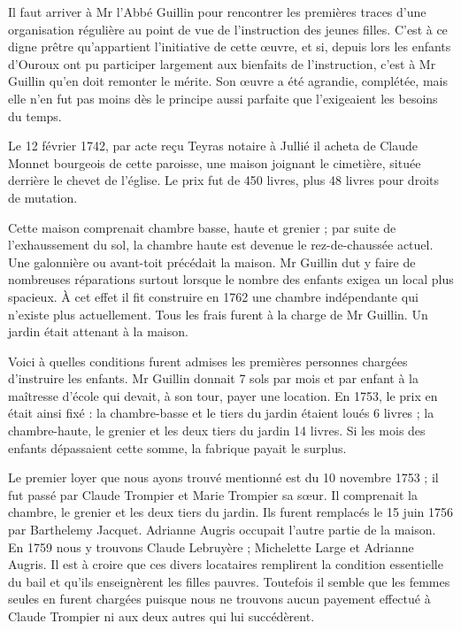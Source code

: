 Il faut arriver à Mr l'Abbé Guillin pour rencontrer les premières traces d'une organisation régulière au point de vue de l'instruction des jeunes filles. C'est à ce digne prêtre qu'appartient l'initiative de cette œuvre, et si, depuis lors les enfants d'Ouroux ont pu participer largement aux bienfaits de l'instruction, c'est
à Mr Guillin qu'en doit remonter le mérite. Son œuvre a été agrandie, complétée, mais elle n'en fut pas moins dès le principe aussi parfaite que l'exigeaient les besoins du temps.

Le 12 février 1742, par acte reçu Teyras notaire à Jullié il acheta de Claude Monnet bourgeois de cette paroisse, une maison joignant le cimetière, située derrière le chevet de l'église. Le prix fut de 450 livres, plus 48 livres pour droits de mutation.

Cette maison comprenait chambre basse, haute et grenier ; par suite de l'exhaussement du sol, la chambre haute est devenue le rez-de-chaussée actuel. Une galonnière ou avant-toit précédait la maison. Mr Guillin dut y faire de nombreuses réparations surtout lorsque le nombre des enfants exigea un local plus spacieux. À cet effet il fit construire en 1762 une chambre indépendante qui n'existe plus actuellement. Tous les frais furent à la charge de Mr Guillin. Un jardin était attenant à la maison.

Voici à quelles conditions furent admises les premières personnes chargées d'instruire les enfants. Mr Guillin donnait 7 sols par mois et par enfant à la maîtresse d'école qui devait, à son tour, payer une location. En 1753, le prix en était ainsi fixé : la chambre-basse et le tiers du jardin étaient loués 6 livres ; la chambre-haute, le grenier et les deux tiers du jardin 14 livres. Si les mois des enfants dépassaient cette somme, la fabrique payait le surplus.

Le premier loyer que nous ayons trouvé mentionné est du 10 novembre 1753 ; il fut passé par Claude Trompier et Marie Trompier sa sœur. Il comprenait la chambre, le grenier et les deux tiers du jardin. Ils furent remplacés le 15 juin 1756 par Barthelemy Jacquet. Adrianne Augris occupait l'autre partie de la maison. En 1759 nous y trouvons Claude Lebruyère ; Michelette Large et Adrianne Augris. Il est à croire que ces divers locataires remplirent la condition essentielle du bail et qu'ils enseignèrent les filles pauvres. Toutefois il semble que les femmes seules en furent chargées puisque nous ne trouvons aucun payement effectué à Claude Trompier ni aux deux autres qui lui succédèrent.

